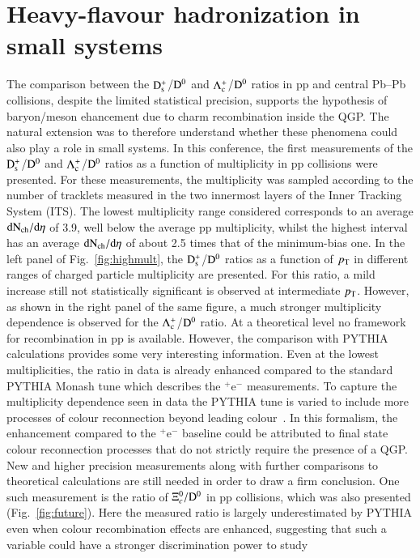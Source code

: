 \documentclass[3p,times,procedia]{elsarticle}
\newcommand{\pt}{p_{\rm T}}
\newcommand{\Dzero}{{\rm D^0}}
\newcommand{\Ds}{{\rm D_{s}^+}}
\newcommand{\Lc}{{\rm \Lambda_{c}^+}}
\begin{document}
\section{Heavy-flavour hadronization in small systems}
\label{recombination}
The comparison between the $\Ds$/$\Dzero$ and $\Lc$/$\Dzero$ ratios in pp and central Pb--Pb collisions, despite the limited statistical precision, 
supports the hypothesis of baryon/meson ehancement due to charm recombination inside the QGP. The natural extension was to therefore
understand whether these phenomena could also play a role in small systems.
In this conference, the first measurements of the $\Ds$/$\Dzero$ and $\Lc$/$\Dzero$ ratios as a function of multiplicity in pp collisions were presented.
For these measurements, the multiplicity was sampled according to the number of tracklets measured in the two innermost layers of the Inner Tracking 
System (ITS). The lowest multiplicity range considered corresponds to an average $\rm dN_{ch}/d\eta$ of 3.9, well below the average pp multiplicity, whilst 
the highest interval has an average $\rm dN_{ch}/d\eta$ of about 2.5 times that of the minimum-bias one.
In the left panel of Fig.~\ref{fig:highmult}, the $\Ds$/$\Dzero$ ratios as a function of $\pt$ in different ranges of charged particle multiplicity are presented. 
For this ratio, a mild increase still not statistically significant is observed at intermediate $\pt$. 
However, as shown in the right panel of the same figure, a much stronger multiplicity dependence is observed 
for the $\Lc$/$\Dzero$ ratio. At a theoretical level no framework for recombination in pp is available. However, the comparison with PYTHIA calculations provides some very interesting information. Even at the lowest multiplicities, the ratio in data is already enhanced compared to the standard PYTHIA Monash tune which describes the $^+$e$^-$ measurements. To capture the multiplicity dependence seen in data the PYTHIA tune is varied to include more processes of colour reconnection beyond leading colour~\cite{pythia8CR}. In this formalism, the enhancement compared to the $^+$e$^-$ baseline could be attributed to
final state colour reconnection processes that do not strictly require the presence of a QGP. 
New and higher precision measurements along with further comparisons to theoretical calculations are still needed in order to draw a firm conclusion. One such measurement is the ratio of $\Xi^{0}_{c}/\Dzero$ in pp collisions, which was also presented (Fig.~\ref{fig:future}). Here the measured ratio is largely underestimated by PYTHIA even when colour recombination effects are enhanced, suggesting that such a variable could have a stronger discrimination power to study
\end{document}
